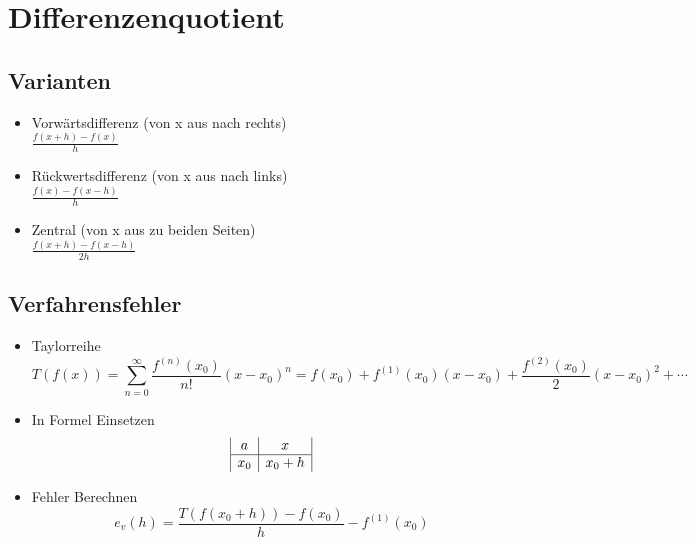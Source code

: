 \section{Differenzenquotient}

\subsection{Varianten}
\begin{itemize}

	\item Vorwärtsdifferenz (von x aus nach rechts) \\
	$\frac{f(x + h) - f(x)}{h}$
	
	\item Rückwertsdifferenz (von x aus nach links) \\
	$\frac{f(x) - f(x - h)}{h}$
	
	\item Zentral (von x aus zu beiden Seiten) \\
	$\frac{f(x + h) - f(x - h)}{2h}$

\end{itemize}

\subsection{Verfahrensfehler}
\begin{itemize}

	\item Taylorreihe \\
	\begin{equation*}
		T(f(x)) = \sum_{n=0}^{\infty}\frac{f^{(n)}(x_0)}{n!} (x - x_0)^n 
		= f(x_0) + f^{(1)}(x_0)(x - x_0) + \frac{f^{(2)}(x_0)}{2} (x - x_0)^2 + \cdots
	\end{equation*}
	
	\item In Formel Einsetzen \\
	\begin{displaymath}
		\begin{array}{| c | c |}
			a & x \\
			\hline
			x_0 & x_0 + h \\
		\end{array}
	\end{displaymath}
	
	\item Fehler Berechnen \\
	\begin{equation*}
		e_v(h) = \frac{T(f(x_0 + h)) - f(x_0)}{h} - f^{(1)}(x_0)	
	\end{equation*}

\end{itemize}

